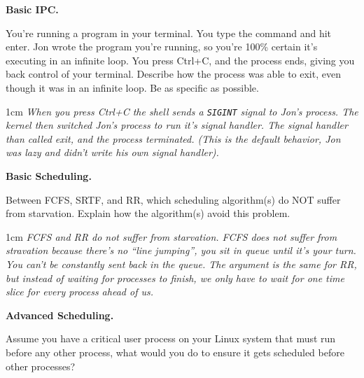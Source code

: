 \documentclass[12pt]{article}
\newenvironment{answer}{\begin{adjustwidth}{1cm}{}\itshape}{\end{adjustwidth}}
\begin{document}
\newpage

\textbf{Basic IPC.}

\vspace{1em}

You're running a program in your terminal. You type the command and hit enter.
Jon wrote the program you're running, so you're 100\% certain it's executing in
an infinite loop. You press Ctrl+C, and the process ends, giving you back
control of your terminal. Describe how the process was able to exit, even though
it was in an infinite loop. Be as specific as possible.

\vspace{1em}

\begin{answer}
  When you press Ctrl+C the shell sends a \texttt{SIGINT} signal to Jon's
  process. The kernel then switched Jon's process to run it's signal handler.
  The signal handler than called exit, and the process terminated. (This is
  the default behavior, Jon was lazy and didn't write his own signal handler).
\end{answer}

\newpage

\textbf{Basic Scheduling.}

\vspace{1em}

Between FCFS, SRTF, and RR, which scheduling algorithm(s) do NOT suffer from
starvation. Explain how the algorithm(s) avoid this problem.

\vspace{1em}

\begin{answer}
  FCFS and RR do not suffer from starvation. FCFS does not suffer from
  stravation because there's no ``line jumping'', you sit in queue until it's
  your turn. You can't be constantly sent back in the queue. The argument
  is the same for RR, but instead of waiting for processes to finish, we only
  have to wait for one time slice for every process ahead of us.
\end{answer}

\newpage

\textbf{Advanced Scheduling.}

\vspace{1em}

Assume you have a critical user process on your Linux system that must run
before any other process, what would you do to ensure it gets scheduled before
other processes?

\vspace{1em}
\end{document}
